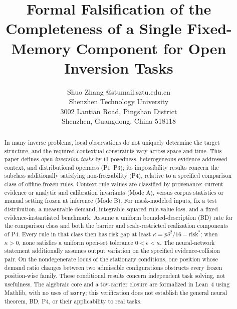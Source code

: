 \documentclass[twoside,11pt]{article}
\begin{document}
\title{Formal Falsification of the Completeness of a Single Fixed-Memory Component for Open Inversion Tasks}

\author{\name Shuo Zhang @stumail.sztu.edu.cn \\
       \addr Shenzhen Technology University\\
       3002 Lantian Road, Pingshan District\\
       Shenzhen, Guangdong, China 518118}


\maketitle

\begin{abstract}%
In many inverse problems, local observations do not uniquely determine the target structure, and the required contextual constraints vary across space and time. This paper defines \emph{open inversion tasks} by ill-posedness, heterogeneous evidence-addressed context, and distributional openness (P1--P3); its impossibility results concern the subclass additionally satisfying non-freezability (P4), relative to a specified comparison class of offline-frozen rules. Context-rule values are classified by provenance: current evidence or analytic and calibration invariants (Mode A), versus corpus statistics or manual setting frozen at inference (Mode B). For mask-modeled inputs, fix a test distribution, a measurable demand, integrable squared rule-value loss, and a fixed evidence-instantiated benchmark. Assume a uniform bounded-description (BD) rate for the comparison class and both the barrier and scale-restricted realization components of P4. Every rule in that class then has risk gap at least $\kappa=p\delta^2/16-\mathrm{risk}^*$; when $\kappa>0$, none satisfies a uniform open-set tolerance $0<\epsilon<\kappa$. The neural-network statement additionally assumes output variation on the specified evidence-collision pair. On the nondegenerate locus of the stationary conditions, one position whose demand ratio changes between two admissible configurations obstructs every frozen position-wise family. These conditional results concern independent task solving, not usefulness. The algebraic core and a toy-carrier closure are formalized in Lean~4 using Mathlib, with no uses of \texttt{sorry}; this verification does not establish the general neural theorem, BD, P4, or their applicability to real tasks.
\end{abstract}
\end{document}
